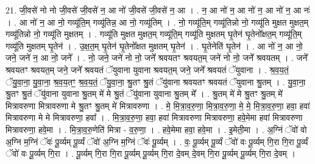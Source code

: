 \documentclass[17pt]{extarticle}
\begin{document}
21. जी॒वसे॑ नो नो जी॒वसे॑ जी॒वसे॑ न॒ आ नो॑ जी॒वसे॑ जी॒वसे॑ न॒ आ । . न॒ आ नो॑ न॒ आ नो॑ न॒ आ नो॑ न॒ आ नः॑ । . आ नो॑ न॒ आ नो॒ गव्यू॑ति॒म् गव्यू॑तिन्न॒ आ नो॒ गव्यू॑तिम् । . नो॒ गव्यू॑ति॒म् गव्यू॑तिन्नो नो॒ गव्यू॑ति मुक्षत मुक्षत॒म् गव्यू॑तिन्नो नो॒ गव्यू॑ति मुक्षतम् । . गव्यू॑ति मुक्षत मुक्षत॒म् गव्यू॑ति॒म् गव्यू॑ति मुक्षतम् घृ॒तेन॑ घृ॒तेनो᳚क्षत॒म् गव्यू॑ति॒म् गव्यू॑ति मुक्षतम् घृ॒तेन॑ । . उ॒क्ष॒त॒म् घृ॒तेन॑ घृ॒तेनो᳚क्षत मुक्षतम् घृ॒तेन॑ । . घृ॒तेनेति॑ घृ॒तेन॑ । . आ नो॑ न॒ आ नो॒ जने॒ जने॑ न॒ आ नो॒ जने᳚ । . नो॒ जने॒ जने॑ नो नो॒ जने᳚ श्रवयतꣳ श्रवयत॒म् जने॑ नो नो॒ जने᳚ श्रवयतम् । . जने᳚ श्रवयतꣳ श्रवयत॒म् जने॒ जने᳚ श्रवयतं ॅयुवाना युवाना श्रवयत॒म् जने॒ जने᳚ श्रवयतं ॅयुवाना । . श्र॒व॒य॒तं॒ ॅयु॒वा॒ना॒ यु॒वा॒ना॒ श्र॒व॒य॒तꣳ॒॒ श्र॒व॒य॒तं॒ ॅयु॒वा॒ना॒ श्रु॒तꣳ श्रु॒तं ॅयु॑वाना श्रवयतꣳ श्रवयतं ॅयुवाना श्रु॒तम् । . यु॒वा॒ना॒ श्रु॒तꣳ श्रु॒तं ॅयु॑वाना युवाना श्रु॒तम् मे॑ मे श्रु॒तं ॅयु॑वाना युवाना श्रु॒तम् मे᳚ । . श्रु॒तम् मे॑ मे श्रु॒तꣳ श्रु॒तम् मे॑ मित्रावरुणा मित्रावरुणा मे श्रु॒तꣳ श्रु॒तम् मे॑ मित्रावरुणा । . मे॒ मि॒त्रा॒व॒रु॒णा॒ मि॒त्रा॒व॒रु॒णा॒ मे॒ मे॒ मि॒त्रा॒व॒रु॒णा॒ हवा॒ हवा॑ मित्रावरुणा मे मे मित्रावरुणा॒ हवा᳚ । . मि॒त्रा॒व॒रु॒णा॒ हवा॒ हवा॑ मित्रावरुणा मित्रावरुणा॒ हवे॒मेमा हवा॑ मित्रावरुणा मित्रावरुणा॒ हवे॒मा । . मि॒त्रा॒व॒रु॒णेति॑ मित्रा - व॒रु॒णा॒ । . हवे॒मेमा हवा॒ हवे॒मा । . इ॒मेती॒मा । . अ॒ग्निं ॅवो॑ वो अ॒ग्नि म॒ग्निं ॅवः॑ पू॒र्व्यम् पू॒र्व्यं ॅवो॑ अ॒ग्नि म॒ग्निं ॅवः॑ पू॒र्व्यम् । . वः॒ पू॒र्व्यम् पू॒र्व्यं ॅवो॑ वः पू॒र्व्यम् गि॒रा गि॒रा पू॒र्व्यं ॅवो॑ वः पू॒र्व्यम् गि॒रा । . पू॒र्व्यम् गि॒रा गि॒रा पू॒र्व्यम् पू॒र्व्यम् गि॒रा दे॒वम् दे॒वम् गि॒रा पू॒र्व्यम् पू॒र्व्यम् गि॒रा दे॒वम् । \newline
\end{document}
